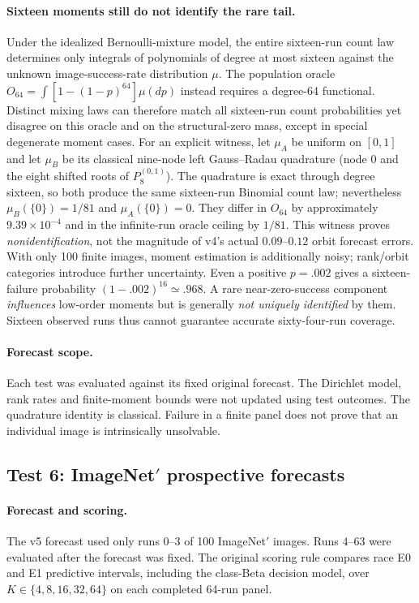 \paragraph{Sixteen moments still do not identify the rare tail.}
Under the idealized Bernoulli-mixture model, the entire
sixteen-run count law determines only integrals of
polynomials of degree at most sixteen against the
unknown image-success-rate distribution $\mu$.
The population oracle
$O_{64}=\int[1-(1-p)^{64}]\mu(dp)$ instead
requires a degree-64 functional. Distinct
mixing laws can therefore match all sixteen-run
count probabilities yet disagree on this oracle
and on the structural-zero mass, except in
special degenerate moment cases.
For an explicit witness, let $\mu_A$ be uniform on
$[0,1]$ and let $\mu_B$ be its classical nine-node
left Gauss--Radau quadrature (node 0 and the eight
shifted roots of $P_8^{(0,1)}$). The quadrature
is exact through degree sixteen, so both produce
the same sixteen-run Binomial count law; nevertheless
$\mu_B(\{0\})=1/81$ and $\mu_A(\{0\})=0$.
They differ in $O_{64}$ by approximately
$9.39\times10^{-4}$ and in the infinite-run
oracle ceiling by $1/81$. This witness proves
\emph{nonidentification}, not the magnitude of
v4's actual $0.09$--$0.12$ orbit forecast errors.
With only 100 finite images, moment estimation
is additionally noisy; rank/orbit categories
introduce further uncertainty. Even a positive
$p=.002$ gives a sixteen-failure probability
$(1-.002)^{16}\simeq.968$.
A rare near-zero-success component \emph{influences}
low-order moments but is generally \emph{not uniquely
identified} by them. Sixteen observed runs thus
cannot guarantee accurate sixty-four-run coverage.

\paragraph{Forecast scope.}
Each test was evaluated against its fixed original forecast.
The Dirichlet model, rank rates and finite-moment bounds
were not updated using test outcomes.
The quadrature identity is classical.
Failure in a finite panel does not prove that
an individual image is intrinsically unsolvable.

\subsection{Test 6: ImageNet$'$ prospective forecasts}
\label{app:s3-test6-xpn-20261102}

\paragraph{Forecast and scoring.}
The v5 forecast used only runs $0$--$3$ of
100 ImageNet$'$ images. Runs $4$--$63$
were evaluated after the forecast was fixed.
The original scoring rule compares race E0 and E1
predictive intervals, including the class-Beta
decision model, over $K\in\{4,8,16,32,64\}$
on each completed 64-run panel.

